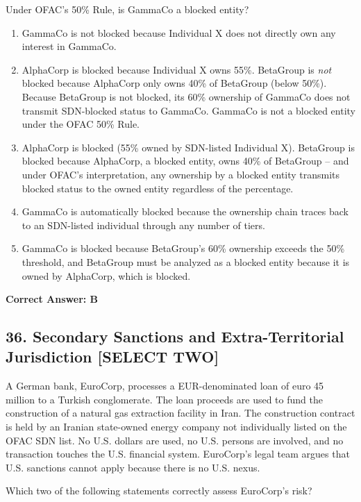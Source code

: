 \documentclass[11pt,a4paper]{article}
\begin{document}
	Under OFAC's 50\% Rule, is GammaCo a blocked entity?
	
	\begin{enumerate}[label=\Alph*.]
		\item GammaCo is not blocked because Individual X does not directly own any interest in GammaCo.
		\item AlphaCorp is blocked because Individual X owns 55\%. BetaGroup is \textit{not} blocked because AlphaCorp only owns 40\% of BetaGroup (below 50\%). Because BetaGroup is not blocked, its 60\% ownership of GammaCo does not transmit SDN-blocked status to GammaCo. GammaCo is not a blocked entity under the OFAC 50\% Rule.
		\item AlphaCorp is blocked (55\% owned by SDN-listed Individual X). BetaGroup is blocked because AlphaCorp, a blocked entity, owns 40\% of BetaGroup -- and under OFAC's interpretation, any ownership by a blocked entity transmits blocked status to the owned entity regardless of the percentage.
		\item GammaCo is automatically blocked because the ownership chain traces back to an SDN-listed individual through any number of tiers.
		\item GammaCo is blocked because BetaGroup's 60\% ownership exceeds the 50\% threshold, and BetaGroup must be analyzed as a blocked entity because it is owned by AlphaCorp, which is blocked.
	\end{enumerate}
	\textbf{Correct Answer: B}
	
	\subsection{36. Secondary Sanctions and Extra-Territorial Jurisdiction \textnormal{[SELECT TWO]}}
	
	A German bank, EuroCorp, processes a EUR-denominated loan of euro 45 million to a Turkish conglomerate. The loan proceeds are used to fund the construction of a natural gas extraction facility in Iran. The construction contract is held by an Iranian state-owned energy company not individually listed on the OFAC SDN list. No U.S. dollars are used, no U.S. persons are involved, and no transaction touches the U.S. financial system. EuroCorp's legal team argues that U.S. sanctions cannot apply because there is no U.S. nexus.
	
	Which two of the following statements correctly assess EuroCorp's risk?
	
\end{document}
